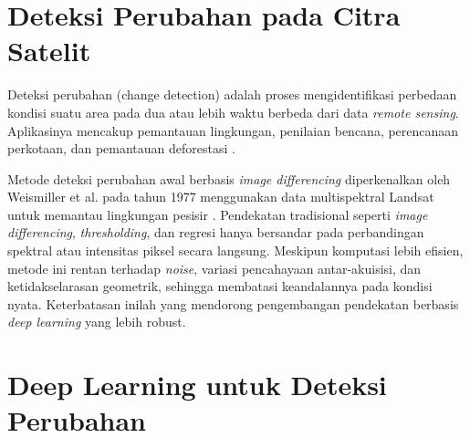 \section{Deteksi Perubahan pada Citra Satelit}





Deteksi perubahan (change detection) adalah proses mengidentifikasi perbedaan kondisi suatu area pada dua atau lebih waktu berbeda dari data \textit{remote sensing}. Aplikasinya mencakup pemantauan lingkungan, penilaian bencana, perencanaan perkotaan, dan pemantauan deforestasi \citep{cheng2023changedetectionmethodsremote}.

Metode deteksi perubahan awal berbasis \textit{image differencing} diperkenalkan oleh Weismiller et al. pada tahun 1977 menggunakan data multispektral Landsat untuk memantau lingkungan pesisir \citep{Jiang31122024}. Pendekatan tradisional seperti \textit{image differencing}, \textit{thresholding}, dan regresi hanya bersandar pada perbandingan spektral atau intensitas piksel secara langsung. Meskipun komputasi lebih efisien, metode ini rentan terhadap \textit{noise}, variasi pencahayaan antar-akuisisi, dan ketidakselarasan geometrik, sehingga membatasi keandalannya pada kondisi nyata. Keterbatasan inilah yang mendorong pengembangan pendekatan berbasis \textit{deep learning} yang lebih robust.

\section{Deep Learning untuk Deteksi Perubahan}





